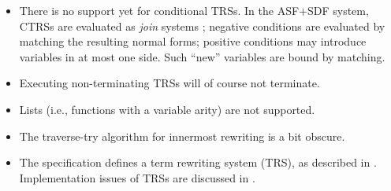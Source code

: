 \begin{itemize}
 \item
   There is no support yet for conditional TRSs. In the ASF+SDF system,
   CTRSs are evaluated as {\it join} systems \cite{Klo91}; negative
   conditions are evaluated by matching the resulting normal forms;
   positive conditions may introduce variables in at most one side. Such
   ``new'' variables are bound by matching.
 \item
   Executing non-terminating TRSs will of course not terminate.
 \item
   Lists (i.e., functions with a variable arity) are not supported.
 \item
   The traverse-try algorithm for innermost rewriting is a bit obscure.
 \item
   The specification defines a term rewriting system (TRS), as described in
   \cite{Klo91}. Implementation issues of TRSs are discussed in \cite{Wal91}.
\end{itemize}



